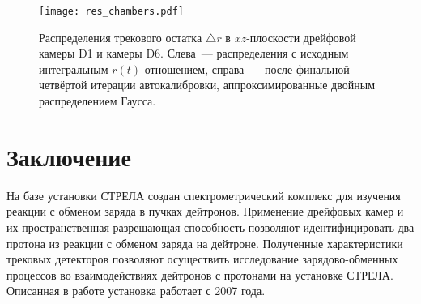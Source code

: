 \begin{figure}[h]
  \centering
  \texttt{[image: res\_chambers.pdf]}
  \caption{Распределения трекового остатка $\triangle r$ в $xz$-плоскости
    дрейфовой камеры D1 и камеры D6. Слева~--- распределения с исходным
    интегральным $r(t)$-отношением, справа~--- после финальной четвёртой
    итерации автокалибровки, аппроксимированные двойным распределением Гаусса.}
  \label{fig:res_chambers}
\end{figure}

\section{Заключение}
На базе установки СТРЕЛА создан спектрометрический комплекс для изучения реакции
с обменом заряда в пучках дейтронов. Применение дрейфовых камер и их
пространственная разрешающая способность позволяют идентифицировать два протона
из реакции с обменом заряда на дейтроне. Полученные характеристики трековых
детекторов позволяют осуществить исследование зарядово-обменных процессов во
взаимодействиях дейтронов с протонами на установке СТРЕЛА. Описанная в работе
установка работает с 2007 года.



